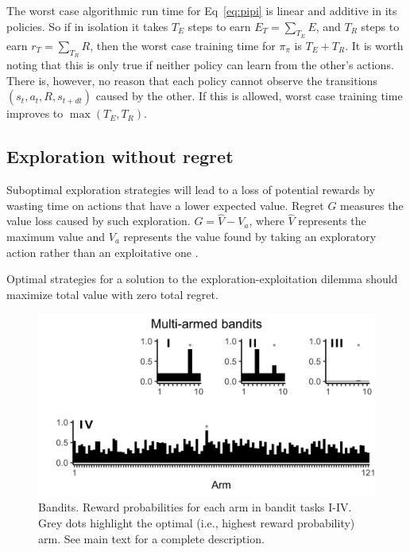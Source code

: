 \documentclass[fleqn,10pt]{wlscirep}
\begin{document}
 The worst case algorithmic run time for Eq~\ref{eq:pipi} is linear and additive in its policies. So if in isolation it takes $T_E$ steps to earn $E_{T} = \sum_{T_E} E$, and $T_R$ steps to earn $r_{T} = \sum_{T_R} R$, then the worst case training time for $\pi_{\pi}$ is $T_E + T_R$. It is worth noting that this is only true if neither policy can learn from the other's actions. There is, however, no reason that each policy cannot observe the transitions $(s_t, a_t, R, s_{t+dt})$ caused by the other. If this is allowed, worst case training time improves to $\max(T_E, T_R)$.

\subsection*{Exploration without regret} Suboptimal exploration strategies will lead to a loss of potential rewards by wasting time on actions that have a lower expected value. Regret $G$ measures the value loss caused by such exploration. $G = \hat V - V_a$, where $\hat V$ represents the maximum value and $V_a$ represents the value found by taking an exploratory action rather than an exploitative one \cite{Sutton2018}. 

Optimal strategies for a solution to the exploration-exploitation dilemma should maximize total value with zero total regret. 

\begin{figure}
	[tbhp] \centering 
	\includegraphics[width=.6\linewidth]{figures/fig2.png} 
	\caption{ \label{fig:f2} Bandits. Reward probabilities for each arm in bandit tasks I-IV. Grey dots highlight the optimal (i.e., highest reward probability) arm. See main text for a complete description.} 
\end{figure}
\end{document}
